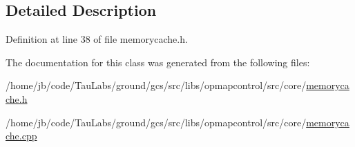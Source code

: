 \subsection{\-Detailed \-Description}


\-Definition at line 38 of file memorycache.\-h.



\-The documentation for this class was generated from the following files\-:\begin{DoxyCompactItemize}
\item 
/home/jb/code/\-Tau\-Labs/ground/gcs/src/libs/opmapcontrol/src/core/\hyperlink{memorycache_8h}{memorycache.\-h}\item 
/home/jb/code/\-Tau\-Labs/ground/gcs/src/libs/opmapcontrol/src/core/\hyperlink{memorycache_8cpp}{memorycache.\-cpp}\end{DoxyCompactItemize}
